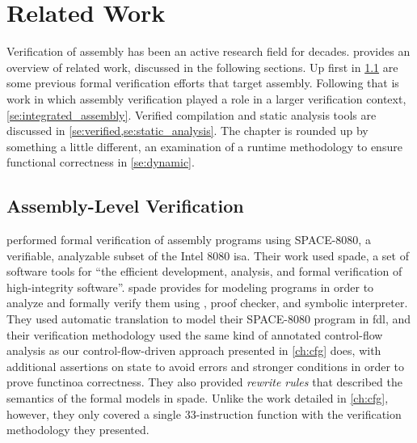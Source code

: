 \chapter{Related Work}\label{ch:related}
Verification of assembly has been an active research field for decades.
 provides an overview of related work,
discussed in the following sections.
Up first in \cref{se:previous_assembly}
are some previous formal verification efforts that target assembly.
Following that is work in which assembly verification played a role
in a larger verification context, \cref{se:integrated_assembly}.
Verified compilation and static analysis tools are discussed
in \cref{se:verified,se:static_analysis}.
The chapter is rounded up by something a little different,
an examination of a runtime methodology to ensure functional correctness
in \cref{se:dynamic}.



\section{Assembly-Level Verification}\label{se:previous_assembly}
\textcite{clutterbuck1988verification} performed formal verification
of assembly programs using SPACE-8080, a verifiable,
analyzable subset of the Intel 8080 \ac{isa}.
Their work used \ac{spade}\autocite{carre1986spade},
a set of software tools for ``the efficient development,
analysis, and formal verification of high-integrity software''.
\Ac{spade} provides  for modeling programs
in order to analyze and formally verify them
using , proof checker, and symbolic interpreter.
They used automatic translation to model their SPACE-8080 program
in \ac{fdl}, and their verification methodology used the same kind of
annotated control-flow analysis as our control-flow-driven approach
presented in \cref{ch:cfg} does, with additional assertions on state to avoid errors
and stronger conditions in order to prove functinoa correctness.
They also provided \emph{rewrite rules} that described the semantics
of the formal models in \ac{spade}. Unlike the work detailed in \cref{ch:cfg}, however,
they only covered a single 33-instruction function
with the verification methodology they presented.

